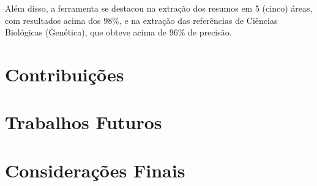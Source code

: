 Além disso, a ferramenta se destacou na extração dos resumos em 5 (cinco) áreas, com resultados acima dos 98\%, e na extração das referências de Ciências Biológicas (Genética), que obteve acima de 96\% de precisão.





\section{Contribuições}
\label{sec:contributions}

\section{Trabalhos Futuros}
\label{sec:future-work}






% 

\section{Considerações Finais}
\label{sec:final-considerations}
